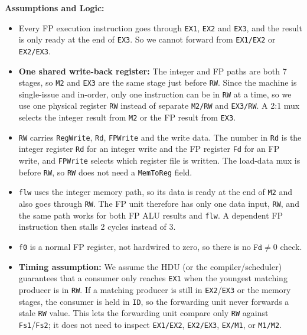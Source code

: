 \documentclass[11pt, a4paper]{article}
\begin{document}
\textbf{Assumptions and Logic:}
\begin{itemize}[noitemsep, topsep=2pt]
    \item Every FP execution instruction goes through \texttt{EX1}, \texttt{EX2} and \texttt{EX3}, and the result is only ready at the end of \texttt{EX3}. So we cannot forward from \texttt{EX1/EX2} or \texttt{EX2/EX3}.
    \item \textbf{One shared write-back register:} The integer and FP paths are both 7 stages, so \texttt{M2} and \texttt{EX3} are the same stage just before \texttt{RW}. Since the machine is single-issue and in-order, only one instruction can be in \texttt{RW} at a time, so we use one physical register \texttt{RW} instead of separate \texttt{M2/RW} and \texttt{EX3/RW}. A 2:1 mux selects the integer result from \texttt{M2} or the FP result from \texttt{EX3}.
    \item \texttt{RW} carries \texttt{RegWrite}, \texttt{Rd}, \texttt{FPWrite} and the write data. The number in \texttt{Rd} is the integer register \texttt{Rd} for an integer write and the FP register \texttt{Fd} for an FP write, and \texttt{FPWrite} selects which register file is written. The load-data mux is before \texttt{RW}, so \texttt{RW} does not need a \texttt{MemToReg} field.
    \item \texttt{flw} uses the integer memory path, so its data is ready at the end of \texttt{M2} and also goes through \texttt{RW}. The FP unit therefore has only one data input, \texttt{RW}, and the same path works for both FP ALU results and \texttt{flw}. A dependent FP instruction then stalls 2 cycles instead of 3.
    \item \texttt{f0} is a normal FP register, not hardwired to zero, so there is no $\texttt{Fd} \neq 0$ check.
    \item \textbf{Timing assumption:} We assume the HDU (or the compiler/scheduler) guarantees that a consumer only reaches \texttt{EX1} when the youngest matching producer is in \texttt{RW}. If a matching producer is still in \texttt{EX2}/\texttt{EX3} or the memory stages, the consumer is held in \texttt{ID}, so the forwarding unit never forwards a stale \texttt{RW} value. This lets the forwarding unit compare only \texttt{RW} against \texttt{Fs1}/\texttt{Fs2}; it does not need to inspect \texttt{EX1/EX2}, \texttt{EX2/EX3}, \texttt{EX/M1}, or \texttt{M1/M2}.
\end{itemize}
\end{document}
